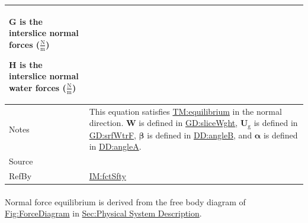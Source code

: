 \documentclass[12pt]{article}
\begin{document}
\begin{minipage}{\textwidth}
\begin{tabular}{>{\raggedright}p{}>{\raggedright\arraybackslash}p{}}
\begin{symbDescription}
              \item{$\symbf{G}$ is the interslice normal forces ($\frac{\text{N}}{\text{m}}$)}
              \item{$\symbf{H}$ is the interslice normal water forces ($\frac{\text{N}}{\text{m}}$)}
              \end{symbDescription}
\\ \midrule
Notes & This equation satisfies \hyperref[TM:equilibrium]{TM:equilibrium} in the normal direction. $\symbf{W}$ is defined in \hyperref[GD:sliceWght]{GD:sliceWght}, ${\symbf{U}_{\text{g}}}$ is defined in \hyperref[GD:srfWtrF]{GD:srfWtrF}, $\symbf{β}$ is defined in \hyperref[DD:angleB]{DD:angleB}, and $\symbf{α}$ is defined in \hyperref[DD:angleA]{DD:angleA}.
        
\\ \midrule
Source & \cite{chen2005}
         
\\ \midrule
RefBy & \hyperref[IM:fctSfty]{IM:fctSfty}
        
\\ \bottomrule
\end{tabular}
\end{minipage}

\paragraph{}
\label{GD:normForcEqDeriv}
Normal force equilibrium is derived from the free body diagram of \hyperref[Figure:ForceDiagram]{Fig:ForceDiagram} in \hyperref[Sec:PhysSyst]{Sec:Physical System Description}.
\end{document}
